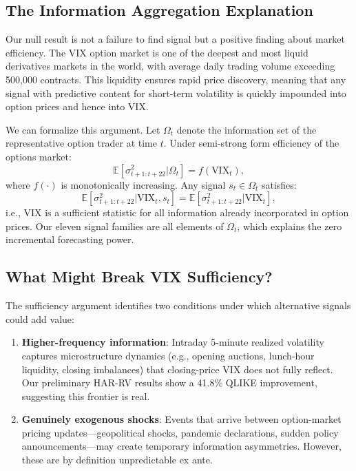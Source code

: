 \documentclass[12pt,a4paper]{article}
\begin{document}
\subsection{The Information Aggregation Explanation}

Our null result is not a failure to find signal but a positive finding about market efficiency. The VIX option market is one of the deepest and most liquid derivatives markets in the world, with average daily trading volume exceeding 500,000 contracts. This liquidity ensures rapid price discovery, meaning that any signal with predictive content for short-term volatility is quickly impounded into option prices and hence into VIX.

We can formalize this argument. Let $\Omega_t$ denote the information set of the representative option trader at time $t$. Under semi-strong form efficiency of the options market:
\begin{equation}
\mathbb{E}[\sigma^2_{t+1:t+22} | \Omega_t] = f(\text{VIX}_t),
\label{eq:efficiency}
\end{equation}
where $f(\cdot)$ is monotonically increasing. Any signal $s_t \in \Omega_t$ satisfies:
\begin{equation}
\mathbb{E}[\sigma^2_{t+1:t+22} | \text{VIX}_t, s_t] = \mathbb{E}[\sigma^2_{t+1:t+22} | \text{VIX}_t],
\label{eq:sufficiency}
\end{equation}
i.e., VIX is a sufficient statistic for all information already incorporated in option prices. Our eleven signal families are all elements of $\Omega_t$, which explains the zero incremental forecasting power.

\subsection{What Might Break VIX Sufficiency?}

The sufficiency argument identifies two conditions under which alternative signals could add value:

\begin{enumerate}
    \item \textbf{Higher-frequency information}: Intraday 5-minute realized volatility captures microstructure dynamics (e.g., opening auctions, lunch-hour liquidity, closing imbalances) that closing-price VIX does not fully reflect. Our preliminary HAR-RV results show a 41.8\% QLIKE improvement, suggesting this frontier is real.

    \item \textbf{Genuinely exogenous shocks}: Events that arrive between option-market pricing updates---geopolitical shocks, pandemic declarations, sudden policy announcements---may create temporary information asymmetries. However, these are by definition unpredictable ex ante.
\end{enumerate}
\end{document}
